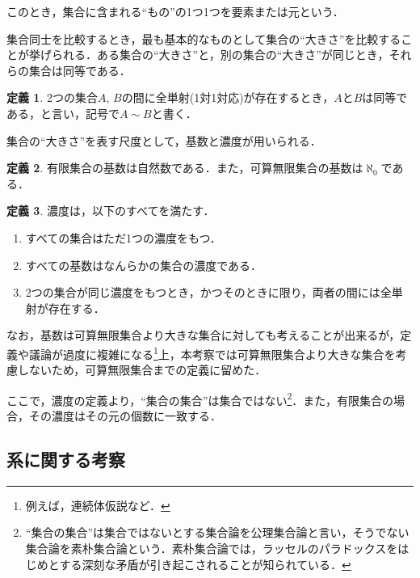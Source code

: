 \documentclass[10pt, a5paper, twoside]{jsarticle}
\theoremstyle{definition}
\newtheorem{dfn}{定義}
\begin{document}
			このとき，集合に含まれる“もの”の1つ1つを要素または元という．


			集合同士を比較するとき，最も基本的なものとして集合の“大きさ”を比較することが挙げられる．ある集合の“大きさ”と，別の集合の“大きさ”が同じとき，それらの集合は同等である．

			\begin{dfn}
				
				2つの集合$A$, $B$の間に全単射(1対1対応)が存在するとき，$A$と$B$は同等である，と言い，記号で$A \sim B$と書く\cite{hara}．

			\end{dfn}


			集合の“大きさ”を表す尺度として，基数と濃度が用いられる．

			\begin{dfn}
				
				有限集合の基数は自然数である．また，可算無限集合の基数は$\aleph_0$である．

			\end{dfn}

			\begin{dfn}

				濃度は，以下のすべてを満たす\cite{nlab}．
				
				\begin{enumerate}
					\item すべての集合はただ1つの濃度をもつ．
					\item すべての基数はなんらかの集合の濃度である．
					\item 2つの集合が同じ濃度をもつとき，かつそのときに限り，両者の間には全単射が存在する．
				\end{enumerate}

			\end{dfn}

			なお，基数は可算無限集合より大きな集合に対しても考えることが出来るが，定義や議論が過度に複雑になる\footnote{例えば，連続体仮説など．}上，本考察では可算無限集合より大きな集合を考慮しないため，可算無限集合までの定義に留めた．

			ここで，濃度の定義より，“集合の集合”は集合ではない\footnote{“集合の集合”は集合ではないとする集合論を公理集合論と言い，そうでない集合論を素朴集合論という．素朴集合論では，ラッセルのパラドックスをはじめとする深刻な矛盾が引き起こされることが知られている．}．また，有限集合の場合，その濃度はその元の個数に一致する．

		\subsection{系に関する考察}
\end{document}
